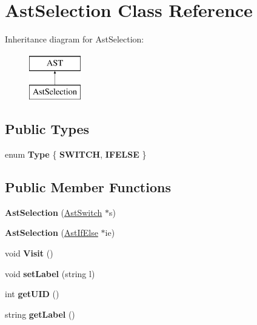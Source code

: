 \hypertarget{classAstSelection}{\section{Ast\-Selection Class Reference}
\label{classAstSelection}
}
Inheritance diagram for Ast\-Selection\-:\begin{figure}[H]
\begin{center}
\leavevmode
\includegraphics[height=2.000000cm]{classAstSelection}
\end{center}
\end{figure}
\subsection*{Public Types}
\begin{DoxyCompactItemize}
\item 
enum {\bfseries Type} \{ {\bfseries S\-W\-I\-T\-C\-H}, 
{\bfseries I\-F\-E\-L\-S\-E}
 \}
\end{DoxyCompactItemize}
\subsection*{Public Member Functions}
\begin{DoxyCompactItemize}
\item 
\hypertarget{classAstSelection_afac2e382bc352b49ca61e6017eb58130}{{\bfseries Ast\-Selection} (\hyperlink{classAstSwitch}{Ast\-Switch} $\ast$s)}\label{classAstSelection_afac2e382bc352b49ca61e6017eb58130}

\item 
\hypertarget{classAstSelection_aaed7d12c4b620b13f70e2d19e15eff0c}{{\bfseries Ast\-Selection} (\hyperlink{classAstIfElse}{Ast\-If\-Else} $\ast$ie)}\label{classAstSelection_aaed7d12c4b620b13f70e2d19e15eff0c}

\item 
\hypertarget{classAstSelection_a811114a424918b2141b5eb0e341c3a22}{void {\bfseries Visit} ()}\label{classAstSelection_a811114a424918b2141b5eb0e341c3a22}

\item 
\hypertarget{classAST_a71d680856e95ff89f55d5311a552eba6}{void {\bfseries set\-Label} (string l)}\label{classAST_a71d680856e95ff89f55d5311a552eba6}

\item 
\hypertarget{classAST_ab7a5b1d9f1c2de0d98deb356f724a42c}{int {\bfseries get\-U\-I\-D} ()}\label{classAST_ab7a5b1d9f1c2de0d98deb356f724a42c}

\item 
\hypertarget{classAST_aee029be902fffc927d16ccb03eb922ad}{string {\bfseries get\-Label} ()}\label{classAST_aee029be902fffc927d16ccb03eb922ad}

\end{DoxyCompactItemize}
